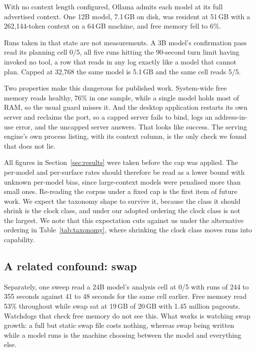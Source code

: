 \documentclass[11pt]{article}
\begin{document}
With no context length configured, Ollama admits each model at its full advertised context. One 12B model, 7.1\,GB
on disk, was resident at 51\,GB with a 262{,}144-token context on a 64\,GB machine, and free memory fell to 6\%.

Runs taken in that state are not measurements. A 3B model's confirmation pass read its planning cell 0/5, all
five runs hitting the 90-second turn limit having invoked no tool, a row that reads in any log exactly like a
model that cannot plan. Capped at 32{,}768 the same model is 5.1\,GB and the same cell reads 5/5.

Two properties make this dangerous for published work. System-wide free memory reads healthy, 76\% in one
sample, while a single model holds most of RAM, so the usual guard misses it. And the desktop application
restarts its own server and reclaims the port, so a capped server fails to bind, logs an address-in-use error,
and the uncapped server answers. That looks like success. The serving engine's own process listing, with its
context column, is the only check we found that does not lie.

All figures in Section~\ref{sec:results} were taken before the cap was applied. The per-model and per-surface
rates should therefore be read as a lower bound with unknown per-model bias, since large-context models were
penalised more than small ones. Re-reading the corpus under a fixed cap is the first item of future work. We
expect the taxonomy shape to survive it, because the class it should shrink is the clock class, and under our
adopted ordering the clock class is not the largest. We note that this expectation cuts against us under the
alternative ordering in Table~\ref{tab:taxonomy}, where shrinking the clock class moves runs into capability.

\subsection{A related confound: swap}

Separately, one sweep read a 24B model's analysis cell at 0/5 with runs of 244 to 355 seconds against 41 to 48
seconds for the same cell earlier. Free memory read 53\% throughout while swap sat at 19\,GB of 20\,GB with 1.45
million pageouts. Watchdogs that check free memory do not see this. What works is watching swap growth: a full
but static swap file costs nothing, whereas swap being written while a model runs is the machine choosing
between the model and everything else.
\end{document}
